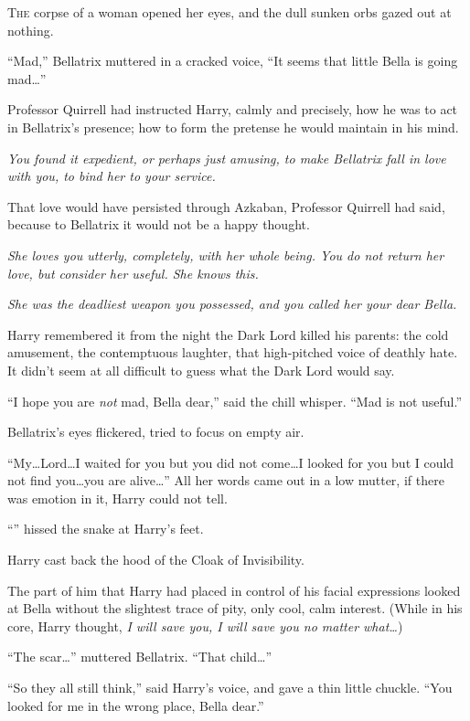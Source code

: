 
\lettrine{T}{he} corpse of a
woman opened her eyes, and the dull sunken orbs gazed out at nothing.

“Mad,” Bellatrix muttered in a cracked voice, “It seems that little Bella is going mad…”

Professor Quirrell had instructed Harry, calmly and precisely, how he was to act in Bellatrix’s presence; how to form the pretense he would maintain in his mind.

\emph{You found it expedient, or perhaps just amusing, to make Bellatrix fall in love with you, to bind her to your service.}

That love would have persisted through Azkaban, Professor Quirrell had said, because to Bellatrix it would not be a happy thought.

\emph{She loves you utterly, completely, with her whole being. You do not return her love, but consider her useful. She knows this.}

\emph{She was the deadliest weapon you possessed, and you called her your dear Bella.}

Harry remembered it from the night the Dark Lord killed his parents: the cold amusement, the contemptuous laughter, that high-pitched voice of deathly hate. It didn’t seem at all difficult to guess what the Dark Lord would say.

“I hope you are \emph{not} mad, Bella dear,” said the chill whisper. “Mad is not useful.”

Bellatrix’s eyes flickered, tried to focus on empty air.

“My…Lord…I waited for you but you did not come…I looked
for you but I could not find you…you are alive…” All her words came out in a low mutter, if there was emotion in it, Harry could not tell.

“” hissed the snake at Harry’s feet.

Harry cast back the hood of the Cloak of Invisibility.

The part of him that Harry had placed in control of his facial expressions looked at Bella without the slightest trace of pity, only cool, calm interest. (While in his core, Harry thought, \emph{I will save you, I will save you no matter what…})

“The scar…” muttered Bellatrix. “That child…”

“So they all still think,” said Harry’s voice, and gave a thin little chuckle. “You looked for me in the wrong place, Bella dear.”

